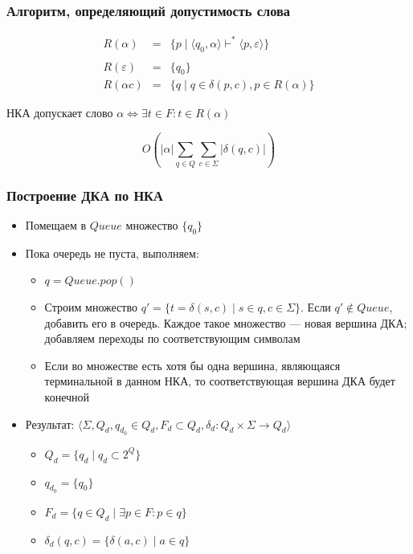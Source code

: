 \documentclass{beamer}
\def\iff{\Leftrightarrow}
\begin{document}
\begin{frame}[fragile]
  \transwipe[direction=90]
  \frametitle{Алгоритм, определяющий допустимость слова}

\[
\begin{array}{rcl}
  R(\alpha)      &=& \{ p \mid \langle q_0, \alpha \rangle \vdash^* \langle p, \varepsilon \rangle\} \\
  & & \\
  R(\varepsilon) &=& \{q_0\} \\
  R(\alpha c)    &=& \{q \mid q \in \delta (p, c), p \in R(\alpha)\}
\end{array}
\]

\vspace{20pt}

\begin{center}
  НКА допускает слово $\alpha \iff \exists t \in F : t \in R(\alpha) $
\end{center}

\[O(|\alpha|\sum_{q \in Q}^{} \sum_{c \in \Sigma}^{} |\delta (q, c)|) \]

\end{frame}

\begin{frame}[fragile]
  \transwipe[direction=90]
  \frametitle{Построение ДКА по НКА}
  \begin{itemize}
    \item Помещаем в $Queue$ множество $\{ q_0 \}$
    \item Пока очередь не пуста, выполняем:
    \begin{itemize}
      \item $q = Queue.pop()$
      \item Строим множество $q' = \{t = \delta (s, c) \mid s \in q, c \in \Sigma\}$. Если $q' \notin Queue$, добавить его в очередь. Каждое такое множество --- новая вершина ДКА; добавляем переходы по соответствующим символам
      \item Если во множестве есть хотя бы одна вершина, являющаяся терминальной в данном НКА, то соответствующая вершина ДКА будет конечной
    \end{itemize}
  \item Результат: $\langle \Sigma, Q_d, q_{d_0} \in Q_d, F_d \subset Q_d, \delta_d: Q_d \times \Sigma \to {Q_d} \rangle$
  \begin{itemize}
    \item $Q_d = \{q_d \mid q_d \subset 2^Q \}$
    \item $q_{d_0} = \{q_0\}$
    \item $F_d = \{q \in Q_d \mid \exists p \in F : p \in q\}$
    \item $\delta_d(q, c) = \{ \delta(a, c) \mid a \in q \}$
  \end{itemize}
  \end{itemize}
\end{frame}
\end{document}
